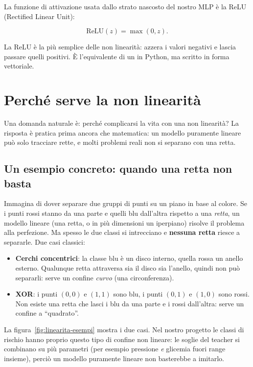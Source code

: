 La funzione di attivazione usata dallo strato nascosto del nostro MLP è la
ReLU (Rectified Linear Unit):

\begin{equation}
\mathrm{ReLU}(z) = \max(0, z).
\end{equation}

La ReLU è la più semplice delle non linearità: azzera i valori negativi e
lascia passare quelli positivi. È l'equivalente di un
 in Python, ma scritto in forma
vettoriale.

\section{Perché serve la non linearità}\label{sec:non-linearita}

Una domanda naturale è: perché complicarsi la vita con una non linearità?
La risposta è pratica prima ancora che matematica: un modello puramente
lineare può solo tracciare rette, e molti problemi reali non si separano con
una retta.

\subsection{Un esempio concreto: quando una retta non basta}\label{sec:nonlinear-esempio}

Immagina di dover separare due gruppi di punti su un piano in base al colore.
Se i punti rossi stanno da una parte e quelli blu dall'altra rispetto a una
\emph{retta}, un modello lineare (una retta, o in più dimensioni un iperpiano)
risolve il problema alla perfezione. Ma spesso le due classi si intrecciano e
\textbf{nessuna retta} riesce a separarle. Due casi classici:

\begin{itemize}
  \item \textbf{Cerchi concentrici}: la classe blu è un disco interno, quella
        rossa un anello esterno. Qualunque retta attraversa sia il disco sia
        l'anello, quindi non può separarli: serve un confine \emph{curvo}
        (una circonferenza).
  \item \textbf{XOR}: i punti $(0,0)$ e $(1,1)$ sono blu, i punti $(0,1)$ e
        $(1,0)$ sono rossi. Non esiste una retta che lasci i blu da una parte
        e i rossi dall'altra: serve un confine a ``quadrato''.
\end{itemize}

La figura~\ref{fig:linearita-esempi} mostra i due casi. Nel nostro progetto le
classi di rischio hanno proprio questo tipo di confine non lineare: le soglie
del teacher si combinano su più parametri (per esempio pressione \emph{e}
glicemia fuori range insieme), perciò un modello puramente lineare non
basterebbe a imitarlo.

